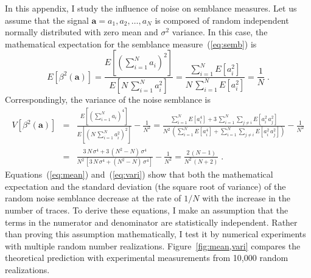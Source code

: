 In this appendix, I study the influence of noise on semblance
measures. Let us assume that the signal
$\mathbf{a}=a_1,a_2,\ldots,a_N$ is composed of random independent
  normally distributed with zero mean and $\sigma^2$
variance. In this case, the mathematical expectation for the semblance
measure~(\ref{eq:semb}) is
\begin{equation}
\label{eq:mean}
E\left[\beta^2(\mathbf{a})\right] = 
\frac{\displaystyle E\left[\left(\sum_{i=1}^N a_i\right)^2\right]}
{\displaystyle E\left[N\,\sum_{i=1}^{N} a_i^2\right]} =
\frac{\displaystyle \sum_{i=1}^{N} E\left[a_i^2\right]}
{\displaystyle N\,\sum_{i=1}^{N} E\left[a_i^2\right]}
 = \frac{1}{N}\;.
\end{equation}
Correspondingly, the variance of the noise semblance is
\begin{eqnarray}
V\left[\beta^2(\mathbf{a})\right] & = & 
\frac{\displaystyle E\left[\left(\sum_{i=1}^N a_i\right)^4\right]}
{\displaystyle E\left[\left(N\,\sum_{i=1}^{N} a_i^2\right)^2\right]} -
\frac{1}{N^2} =
\frac{\displaystyle \sum_{i=1}^{N} E\left[a_i^4\right] +
3\,\sum_{i=1}^{N} \sum_{j \ne i} E\left[a_i^2\,a_j^2\right]}
{\displaystyle N^2\,\left(\sum_{i=1}^{N} E\left[a_i^4\right] +
\sum_{i=1}^{N} \sum_{j \ne i} E\left[a_i^2\,a_j^2\right]\right)} -
\frac{1}{N^2} \nonumber \\ 
& = &
\frac{3\,N\,\sigma^4 + 3\,(N^2-N)\,\sigma^4}
{N^2\,\left[3\,N\,\sigma^4 + (N^2-N)\,\sigma^4\right]} - 
\frac{1}{N^2} = \frac{2\,(N-1)}{N^2\,(N+2)}\;.
\label{eq:vari}
\end{eqnarray}
Equations~(\ref{eq:mean}) and~(\ref{eq:vari}) show that both the
mathematical expectation and the standard deviation (the square root
of variance) of the random noise semblance decrease at the rate of
$1/N$ with the increase in the number of traces. To derive these
equations, I make an assumption that the terms in the numerator and
denominator are statistically independent. Rather than proving this
assumption mathematically, I test it by numerical experiments with
multiple random number realizations. Figure~\ref{fig:mean,vari}
compares the theoretical prediction with experimental measurements
from 10,000 random realizations.

